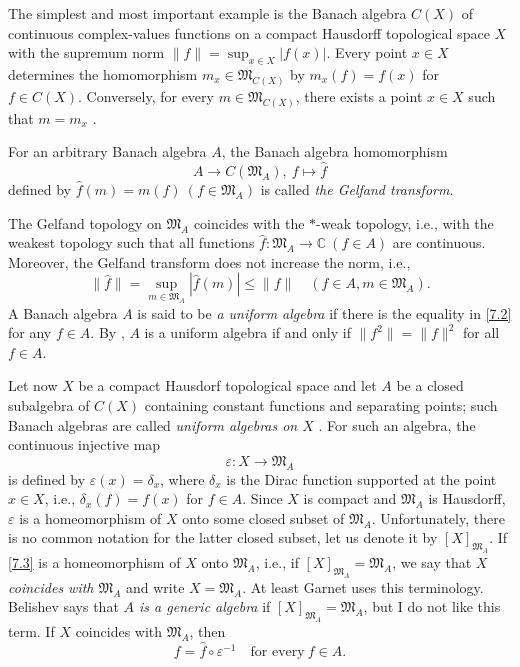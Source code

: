 \documentclass[12pt,reqno]{amsart}
\begin{document}
The simplest and most important example is the Banach algebra $C(X)$ of continuous complex-values functions on a compact Hausdorff topological space $X$ with the supremum norm
$\|f\|=\sup_{x\in X}|f(x)|$.
Every point $x\in X$ determines the homomorphism $m_x\in{\mathfrak M}_{C(X)}$ by $m_x(f)=f(x)$ for $f\in C(X)$. Conversely, for every $m\in{\mathfrak M}_{C(X)}$, there exists a point $x\in X$ such that $m=m_x$ \cite[Chapter I, Section 3]{Gm}.

For an arbitrary Banach algebra $A$, the Banach algebra homomorphism
$$
A\to C({\mathfrak M}_A),\ f\mapsto\widehat f
$$
defined by
$
\widehat f(m)=m(f)\ (f\in{\mathfrak M}_A)
$
is called {\it the Gelfand transform}.

The Gelfand topology on ${\mathfrak M}_A$ coincides with the $\ast$-weak topology, i.e., with the weakest topology such that all functions $\widehat f:{\mathfrak M}_A\to{\mathbb C}\ (f\in A)$ are continuous. Moreover, the Gelfand transform does not increase the norm, i.e.,
\begin{equation}
\|\widehat f\|=\sup_{m\in{\mathfrak M}_A}|\widehat f(m)|\le\|f\|\quad (f\in A,m\in{\mathfrak M}_A).
                                \label{7.2}
\end{equation}
A Banach algebra $A$ is said to be {\it a uniform algebra} if there is the equality in \eqref{7.2} for any $f\in A$. By
\cite[Chaper V, Theorem 1.2]{G}, $A$ is a uniform algebra if and only if $\|f^2\|=\|f\|^2$ for all $f\in A$.

Let now $X$ be a compact Hausdorf topological space and let $A$ be a closed subalgebra of $C(X)$ containing constant functions and separating points; such Banach algebras are called {\it uniform algebras on $X$} \cite[Chapter V, Section 1, Example 1]{G}. For such an algebra, the continuous injective map
\begin{equation}
\varepsilon:X\to{\mathfrak M}_A
                                \label{7.3}
\end{equation}
is defined by $\varepsilon(x)=\delta_x$, where $\delta_x$ is the Dirac function supported at the point $x\in X$, i.e., $\delta_x(f)=f(x)$ for $f\in A$. Since $X$ is compact and ${\mathfrak M}_A$ is Hausdorff, $\varepsilon$ is a homeomorphism of $X$ onto some closed subset of ${\mathfrak M}_A$. Unfortunately, there is no common notation for the latter closed subset, let us denote it by $[X]_{{\mathfrak M}_A}$.
If \eqref{7.3} is a homeomorphism of $X$ onto ${\mathfrak M}_A$, i.e., if $[X]_{{\mathfrak M}_A}={\mathfrak M}_A$, we say that {\it $X$ coincides with ${\mathfrak M}_A$} and write $X={\mathfrak M}_A$. At least Garnet \cite{G} uses this terminology. Belishev \cite{Be} says that
{\it $A$ is a generic algebra} if $[X]_{{\mathfrak M}_A}={\mathfrak M}_A$, but I do not like this term. If $X$ coincides with
${\mathfrak M}_A$, then
$$
f=\widehat f\circ\varepsilon^{-1}\quad\mbox{for every}\ f\in A.
$$
\end{document}
